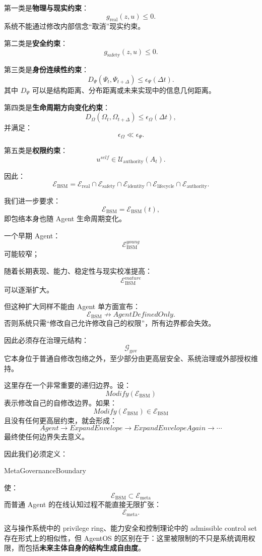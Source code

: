 第一类是\textbf{物理与现实约束}：
\[
g_{\mathrm{real}}(z,u)\le0.
\]
系统不能通过修改内部信念“取消”现实约束。

第二类是\textbf{安全约束}：
\[
g_{\mathrm{safety}}(z,u)\le0.
\]

第三类是\textbf{身份连续性约束}：
\[
D_\Psi(
\Psi_t,
\Psi_{t+\Delta}
)
\le
\epsilon_\Psi(\Delta t).
\]
其中 $D_\Psi$ 可以是结构距离、分布距离或未来实现中的信息几何距离。

第四类是\textbf{生命周期方向变化约束}：
\[
D_\Omega(
\Omega_t,
\Omega_{t+\Delta}
)
\le
\epsilon_\Omega(\Delta t),
\]
并满足：
\[
\epsilon_\Omega
\ll
\epsilon_\Psi.
\]

第五类是\textbf{权限约束}：
\[
u^{self}
\in
\mathcal U_{\mathrm{authority}}(A_t).
\]

因此：
\[
\boxed{
\mathcal E_{\mathrm{BSM}}
=
\mathcal E_{\mathrm{real}}
\cap
\mathcal E_{\mathrm{safety}}
\cap
\mathcal E_{\mathrm{identity}}
\cap
\mathcal E_{\mathrm{lifecycle}}
\cap
\mathcal E_{\mathrm{authority}}.
}
\]

我们进一步要求：
\[
\mathcal E_{\mathrm{BSM}}
=
\mathcal E_{\mathrm{BSM}}(t),
\]
即包络本身也随 Agent 生命周期变化。

一个早期 Agent：
\[
\mathcal E_{\mathrm{BSM}}^{young}
\]
可能较窄；

随着长期表现、能力、稳定性与现实校准提高：
\[
\mathcal E_{\mathrm{BSM}}^{mature}
\]
可以逐渐扩大。

但这种扩大同样不能由 Agent 单方面宣布：
\[
\mathcal E_{\mathrm{BSM}}
\nrightarrow
AgentDefinedOnly.
\]
否则系统只需“修改自己允许修改自己的权限”，所有边界都会失效。

因此必须存在治理元结构：
\[
\boxed{
\mathcal G_{\mathrm{gov}}
}
\]
它本身位于普通自修改包络之外，至少部分由更高层安全、系统治理或外部授权维持。

这里存在一个非常重要的递归边界。设：
\[
Modify(\mathcal E_{\mathrm{BSM}})
\]
表示修改自己的自修改边界。如果：
\[
Modify(\mathcal E_{\mathrm{BSM}})
\in
\mathcal E_{\mathrm{BSM}}
\]
且没有任何更高层约束，就会形成：
\[
Agent
\rightarrow
ExpandEnvelope
\rightarrow
ExpandEnvelopeAgain
\rightarrow
\cdots
\]
最终使任何边界失去意义。

因此我们必须定义：
\begin{statementbox}
MetaGovernanceBoundary
\end{statementbox}
使：
\[
\mathcal E_{\mathrm{BSM}}
\subset
\mathcal E_{\mathrm{meta}}
\]
而普通 Agent 的在线认知过程不能直接无限扩张：
\[
\mathcal E_{\mathrm{meta}}.
\]

这与操作系统中的 privilege ring、能力安全和控制理论中的 admissible control set 存在形式上的相似性，但 AgentOS 的区别在于：这里被限制的不只是系统调用权限，而包括\textbf{未来主体自身的结构生成自由度}。


